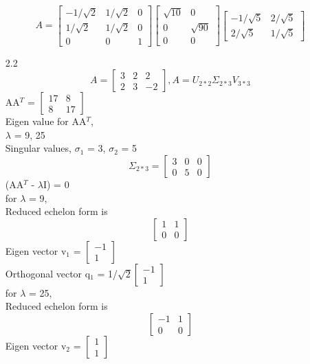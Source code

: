 \documentclass[12pt]{article}
\begin{document}
\begin{enumerate}[label=\alph*)]
\[\]
\[
A = \begin{bmatrix}  -1/\sqrt{2} & 1/\sqrt{2} & 0\\ 1/\sqrt{2} & 1/\sqrt{2} & 0\\0 & 0 & 1\end{bmatrix}
\begin{bmatrix}  \sqrt{10} & 0\\0 & \sqrt{90}\\0 & 0\end{bmatrix}
\begin{bmatrix}  -1/\sqrt{5} & 2/\sqrt{5}\\ 2/\sqrt{5} & 1/\sqrt{5}\end{bmatrix}
\]
\item[2.2]
\[
A = \begin{bmatrix} 3 & 2 & 2\\2 & 3 &-2\end{bmatrix},
A = U_{2*2}\Sigma_{2*3}V_{3*3}
\]
AA$^T$ = $\begin{bmatrix} 17 & 8\\8 & 17\end{bmatrix}$\\
Eigen value for AA$^T$,\\
$\lambda$ = 9, 25\\
Singular values, $\sigma_{1}$ = 3, $\sigma_{2}$ = 5
\[
\Sigma_{2*3} = \begin{bmatrix}  3 & 0 & 0\\0 & 5 & 0\end{bmatrix}
\]
(AA$^T$ - $\lambda$I) = 0\\
for $\lambda$ = 9,\\
Reduced echelon form is
\[
\begin{bmatrix} 1 & 1\\0 & 0\end{bmatrix}
\]
Eigen vector v$_{1}$ = $\begin{bmatrix} -1\\1\end{bmatrix}$\\
Orthogonal vector q$_{1}$ = 1/$\sqrt{2}$$\begin{bmatrix} -1\\1\end{bmatrix}$\\
for $\lambda$ = 25,\\
Reduced echelon form is
\[
\begin{bmatrix} -1 & 1\\0 & 0\end{bmatrix}
\]
Eigen vector v$_{2}$ = $\begin{bmatrix} 1\\1\end{bmatrix}$\\
$$
\end{enumerate}
\end{document}
